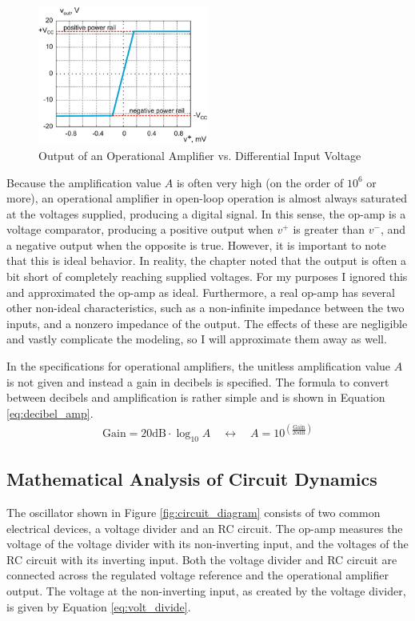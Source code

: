 \documentclass[12pt]{article}
\begin{document}
\begin{figure}[h!]
\centering
\includegraphics[width=0.5\textwidth]{op-amp_func.png}
\caption{Output of an Operational Amplifier vs. Differential Input Voltage}
\label{fig:op-amp_fn}
\end{figure}

Because the amplification value $A$ is often very high (on the order of $10^6$ or more), an operational amplifier in open-loop operation is almost always saturated at the voltages supplied, producing a digital signal. In this sense, the op-amp is a voltage comparator, producing a positive output when $v^+$ is greater than $v^-$, and a negative output when the opposite is true. However, it is important to note that this is ideal behavior. In reality, the chapter noted that the output is often a bit short of completely reaching supplied voltages. For my purposes I ignored this and approximated the op-amp as ideal. Furthermore, a real op-amp has several other non-ideal characteristics, such as a non-infinite impedance between the two inputs, and a nonzero impedance of the output. The effects of these are negligible and vastly complicate the modeling, so I will approximate them away as well.\par

In the specifications for operational amplifiers, the unitless amplification value $A$ is not given and instead a gain in decibels is specified. The formula to convert between decibels and amplification is rather simple and is shown in Equation \ref{eq:decibel_amp}.
\begin{align} \label{eq:decibel_amp}
    \text{Gain} = 20 \text{dB} \cdot \log_{10}A \quad \leftrightarrow \quad A = 10^{\left(\frac{\text{Gain}}{20 \text{dB}}\right)}
\end{align}

\subsection{Mathematical Analysis of Circuit Dynamics}
The oscillator shown in Figure \ref{fig:circuit_diagram} consists of two common electrical devices, a voltage divider and an RC circuit. The op-amp measures the voltage of the voltage divider with its non-inverting input, and the voltages of the RC circuit with its inverting input. Both the voltage divider and RC circuit are connected across the regulated voltage reference and the operational amplifier output. The voltage at the non-inverting input, as created by the voltage divider, is given by Equation \ref{eq:volt_divide}.
\end{document}
